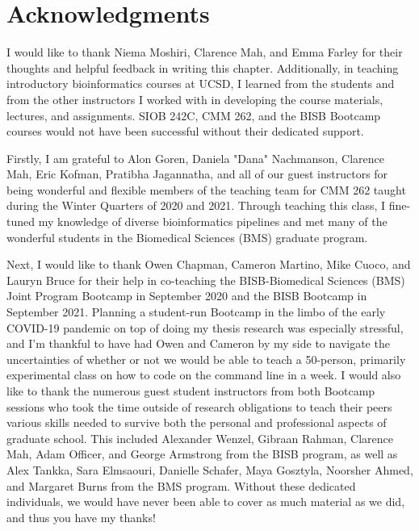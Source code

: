 \section{Acknowledgments}

I would like to thank Niema Moshiri, Clarence Mah, and Emma Farley for their thoughts and helpful feedback in writing this chapter. Additionally, in teaching introductory bioinformatics courses at UCSD, I learned from the students and from the other instructors I worked with in developing the course materials, lectures, and assignments. SIOB 242C, CMM 262, and the BISB Bootcamp courses would not have been successful without their dedicated support. 

Firstly, I am grateful to Alon Goren, Daniela "Dana" Nachmanson, Clarence Mah, Eric Kofman, Pratibha Jagannatha, and all of our guest instructors for being wonderful and flexible members of the teaching team for CMM 262 taught during the Winter Quarters of 2020 and 2021. Through teaching this class, I fine-tuned my knowledge of diverse bioinformatics pipelines and met many of the wonderful students in the Biomedical Sciences (BMS) graduate program. 

Next, I would like to thank Owen Chapman, Cameron Martino, Mike Cuoco, and Lauryn Bruce for their help in co-teaching the BISB-Biomedical Sciences (BMS) Joint Program Bootcamp in September 2020 and the BISB Bootcamp in September 2021. Planning a student-run Bootcamp in the limbo of the early COVID-19 pandemic on top of doing my thesis research was especially stressful, and I’m thankful to have had Owen and Cameron by my side to navigate the uncertainties of whether or not we would be able to teach a 50-person, primarily experimental class on how to code on the command line in a week. I would also like to thank the numerous guest student instructors from both Bootcamp sessions who took the time outside of research obligations to teach their peers various skills needed to survive both the personal and professional aspects of graduate school. This included Alexander Wenzel, Gibraan Rahman, Clarence Mah, Adam Officer, and George Armstrong from the BISB program, as well as Alex Tankka, Sara Elmsaouri, Danielle Schafer, Maya Gosztyla, Noorsher Ahmed, and Margaret Burns from the BMS program. Without these dedicated individuals, we would have never been able to cover as much material as we did, and thus you have my thanks! 


